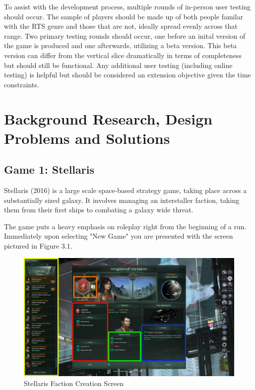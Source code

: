 \documentclass{report}
\begin{document}
To assist with the development process, multiple rounds of in-person user testing should occur. The sample of players should be made up of both people familar with the RTS genre and those that are not, ideally spread evenly across that range. Two primary testing rounds should occur, one before an inital version of the game is produced and one afterwards, utilizing a beta version. This beta version can differ from the vertical slice dramatically in terms of completeness but should still be functional.
Any additional user testing (including online testing) is helpful but should be considered an extension objective given the time constraints.

\pagebreak
\section{Background Research, Design Problems and Solutions}

\subsection{Game 1: Stellaris}

Stellaris (2016) is a large scale space-based strategy game, taking place across a substantially sized galaxy. It involves managing an interstaller faction, taking them from their first ships to combating a galaxy wide threat. 

The game puts a heavy emphasis on roleplay right from the beginning of a run. Immediately upon selecting "New Game" you are presented with the screen pictured in Figure 3.1.

\begin{figure}[h]
    \includegraphics[width=\textwidth]{stellaris_faction_creation.png}
    \caption{Stellaris Faction Creation Screen}
\end{figure}
\end{document}
